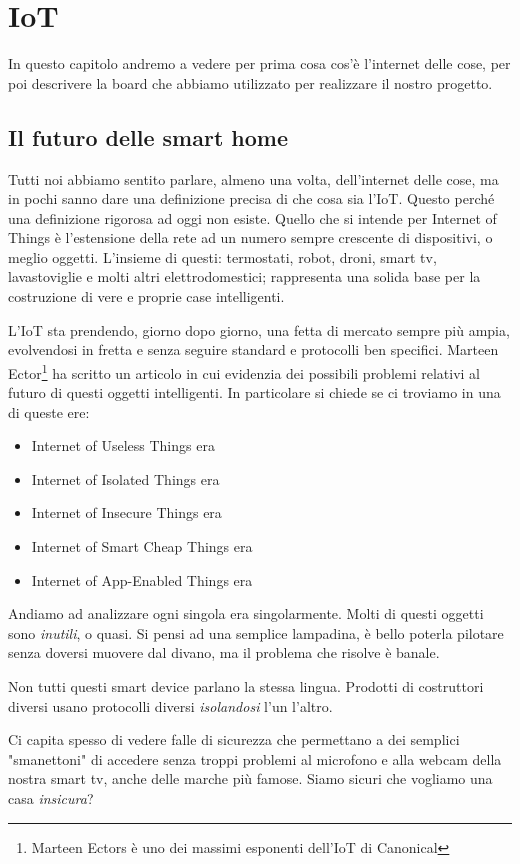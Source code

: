 \chapter{IoT}
In questo capitolo andremo a vedere per prima cosa cos'è l'internet delle cose, per poi descrivere la board che abbiamo utilizzato per realizzare il nostro progetto. 

\section{Il futuro delle smart home}
Tutti noi abbiamo sentito parlare, almeno una volta, dell'internet delle cose,
ma in pochi sanno dare una definizione precisa di che cosa sia l'IoT.
Questo perché una definizione rigorosa ad oggi non esiste.
Quello che si intende per Internet of Things è l'estensione della rete ad un numero sempre crescente di dispositivi, o meglio oggetti.
L'insieme di questi: termostati, robot, droni, smart tv, lavastoviglie e molti altri elettrodomestici; rappresenta una solida base per la costruzione di vere e proprie case intelligenti.

L'IoT sta prendendo, giorno dopo giorno, una fetta di mercato sempre più ampia, evolvendosi in fretta e senza seguire standard e protocolli ben specifici. 
Marteen Ector\footnote{Marteen Ectors è uno dei massimi esponenti dell'IoT di  Canonical} ha scritto un articolo\cite{smart} in cui evidenzia dei possibili problemi relativi al futuro di questi oggetti intelligenti.
In particolare si chiede se ci troviamo in una di queste ere:
\begin{itemize}
\item Internet of Useless Things era
\item Internet of Isolated Things era
\item Internet of Insecure Things era
\item Internet of Smart Cheap Things era
\item Internet of App-Enabled Things era
\end{itemize}
Andiamo ad analizzare ogni singola era singolarmente. 
Molti di questi oggetti sono \emph{inutili}, o quasi. Si pensi ad una semplice lampadina, è bello poterla pilotare senza doversi muovere dal divano, ma il problema che risolve è banale.

Non tutti questi smart device parlano la stessa lingua. Prodotti di costruttori diversi usano protocolli diversi \emph{isolandosi} l'un l'altro.

Ci capita spesso di vedere falle di sicurezza che permettano a dei semplici "smanettoni" di accedere senza troppi problemi al microfono e alla webcam della nostra smart tv, anche delle marche più famose.
Siamo sicuri che vogliamo una casa \emph{insicura}?

